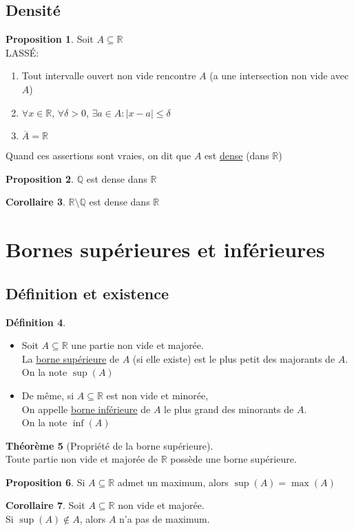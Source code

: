 \documentclass[10pt,a4paper]{article}
\theoremstyle{definition}
\newtheorem{proposition}{Proposition}[section]
\newtheorem{theorem}[proposition]{Théorème}
\newtheorem{corollaire}[proposition]{Corollaire}
\newtheorem{definition}[proposition]{Définition}
\begin{document}
\subsection{Densité}
\begin{proposition}
Soit $A \subseteq \mathbb{R}$ \\
LASSÉ:
\begin{enumerate}
\item Tout intervalle ouvert non vide rencontre $A$ (a une intersection non vide avec $A$)
\item $\forall x \in \mathbb{R}$, $\forall \delta > 0$, $\exists a \in A: \left| x - a \right| \leq \delta$
\item $\overline{A} = \mathbb{R}$
\end{enumerate}
Quand ces assertions sont vraies, on dit que $A$ est \uline{dense} (dans $\mathbb{R}$)
\end{proposition}
\begin{proposition}
$\mathbb{Q}$ est dense dans $\mathbb{R}$
\end{proposition}
\begin{corollaire}
$\mathbb{R} \setminus \mathbb{Q}$ est dense dans $\mathbb{R}$
\end{corollaire}

\section{Bornes supérieures et inférieures}
\subsection{Définition et existence}
\begin{definition}
\hfill
\begin{itemize}
\item Soit $A \subseteq \mathbb{R}$ une partie non vide et majorée. \\
La \uline{borne supérieure} de $A$ (si elle existe) est le plus petit des majorants de $A$. \\
On la note $\sup(A)$
\item De même, si $A \subseteq \mathbb{R}$ est non vide et minorée, \\
On appelle \uline{borne inférieure} de $A$ le plus grand des minorants de $A$. \\
On la note $\inf(A)$
\end{itemize}
\end{definition}
\begin{theorem}[Propriété de la borne supérieure]
\hfill \\
Toute partie non vide et majorée de $\mathbb{R}$ possède une borne supérieure.
\end{theorem}
\begin{proposition}
Si $A \subseteq \mathbb{R}$ admet un maximum, alors $\sup(A) = \max(A)$
\end{proposition}
\begin{corollaire}
Soit $A \subseteq \mathbb{R}$ non vide et majorée. \\
Si $\sup(A) \notin A$, alors $A$ n'a pas de maximum.
\end{corollaire}
\end{document}
